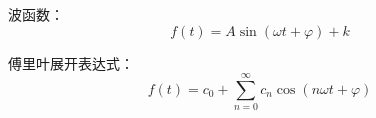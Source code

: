 \documentclass[UTF8]{ctexart}
\begin{document}
波函数：
\[ f(t) = A\sin(\omega t + \varphi) + k \]


傅里叶展开表达式：
\[ f(t) = c_{0} + \sum_{n=0}^{\infty}c_{n} \cos(n\omega t + \varphi) \]
\end{document}
